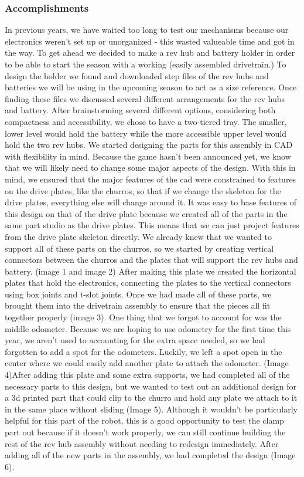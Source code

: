 \subsubsection*{Accomplishments}
 In previous years, we have waited too long to test our mechanisms because our electronics weren’t set up or unorganized - this wasted valueable time and got in the way. To get ahead we decided to make a rev hub and battery holder in order to be able to start the season with a working (easily assembled drivetrain.)
To design the holder we found and downloaded step files of the rev hubs and batteries we will be using in the upcoming season to act as a size reference. Once finding these files we discussed several different arrangements for the rev hubs and battery. After brainstorming several different options, considering both compactness and accessibility, we chose to have a two-tiered tray. The smaller, lower level would hold the battery while the more accessible upper level would hold the two rev hubs.
We started designing the parts for this assembly in CAD with flexibility in mind. Because the game hasn’t been announced yet, we know that we will likely need to change some major aspects of the design. With this in mind, we ensured that the major features of the cad were constrained to features on the drive plates, like the churros, so that if we change the skeleton for the drive plates, everything else will change around it. It was easy to base features of this design on that of the drive plate because we created all of the parts in the same part studio as the drive plates. This means that we can just project features from the drive plate skeleton directly. We already knew that we wanted to support all of these parts on the churros, so we started by creating vertical connectors between the churros and the plates that will support the rev hubs and battery. (image 1 and image 2) After making this plate we created the horizontal plates that hold the electronics, connecting the plates to the vertical connectors using box joints and t-slot joints.
Once we had made all of these parts, we brought them into the drivetrain assembly to ensure that the pieces all fit together properly (image 3). One thing that we forgot to account for was the middle odometer. Because we are hoping to use odometry for the first time this year, we aren’t used to accounting for the extra space needed, so we had forgotten to add a spot for the odometers. Luckily, we left a spot open in the center where we could easily add another plate to attach the odometer. (Image 4)After adding this plate and some extra supports, we had completed all of the necessary parts to this design, but we wanted to test out an additional design for a 3d printed part that could clip to the churro and hold any plate we attach to it in the same place without sliding (Image 5). Although it wouldn’t be particularly helpful for this part of the robot, this is a good opportunity to test the clamp part out because if it doesn’t work properly, we can still continue building the rest of the rev hub assembly without needing to redesign immediately. After adding all of the new parts in the assembly, we had completed the design (Image 6).

